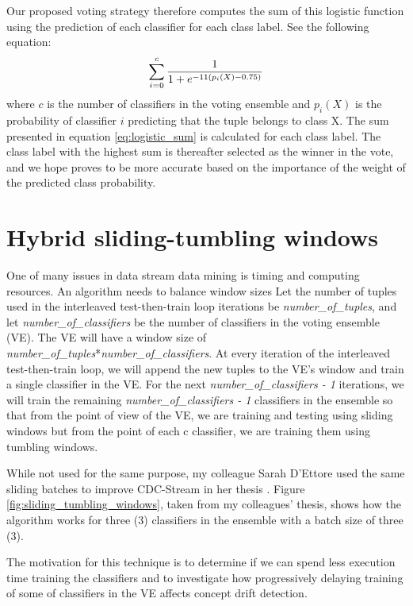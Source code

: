 Our proposed voting strategy therefore computes the sum of this logistic function using the prediction of each classifier for each class label. See the following equation:
\begin{equation}
    \sum_{i=0}^{c} \frac{1}{1+e^{-11(p_i(X)-0.75)}}\\ 
    \label{eq:logistic_sum}
\end{equation}
where $c$ is the number of classifiers in the voting ensemble and $p_i(X)$ is the probability of classifier $i$ predicting that the tuple belongs to class X. 
The sum presented in equation \ref{eq:logistic_sum} is calculated for each class label. The class label with the highest sum is thereafter selected as the winner in the vote, and we hope proves to be more accurate based on the importance of the weight of the predicted class probability.


\section{Hybrid sliding-tumbling windows}
One of many issues in data stream data mining is timing and computing resources. An algorithm needs to balance window sizes 
Let the number of tuples used in the interleaved test-then-train loop iterations be \textit{number\_of\_tuples}, and let \textit{number\_of\_classifiers} be the number of classifiers in the voting ensemble (VE). The VE will have a window size of \textit{number\_of\_tuples}*\textit{number\_of\_classifiers}. At every iteration of the interleaved test-then-train loop, we will append the new tuples to the VE's window and train a single classifier in the VE. For the next \textit{number\_of\_classifiers - 1} iterations, we will train the remaining \textit{number\_of\_classifiers - 1} classifiers in the ensemble so that from the point of view of the VE, we are training and testing using sliding windows but from the point of each c classifier, we are training them using tumbling windows.

While not used for the same purpose, my colleague Sarah D'Ettore used the same sliding batches to improve CDC-Stream in her thesis \citep{d2016fine}. Figure \ref{fig:sliding_tumbling_windows}, taken from my colleagues' thesis, shows how the algorithm works for three (3) classifiers in the ensemble with a batch size of three (3).

The motivation for this technique is to determine if we can spend less execution time training the classifiers and to investigate how progressively delaying training of some of classifiers in the VE affects concept drift detection.

